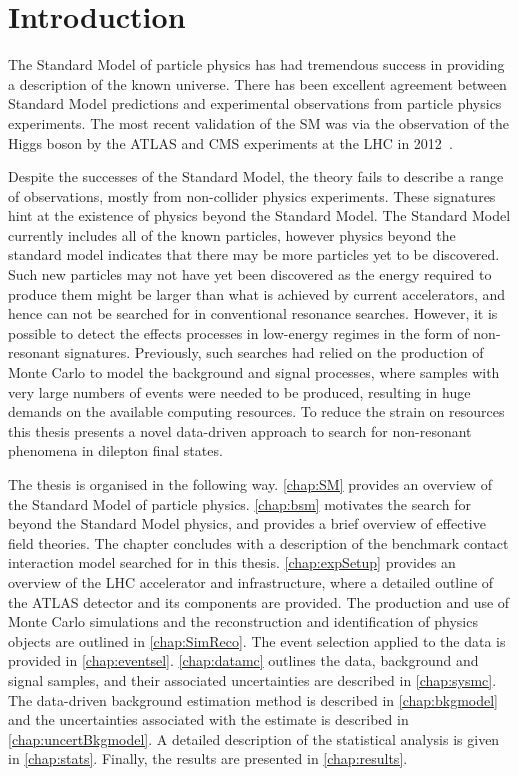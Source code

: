 \chapter{Introduction}\label{chap:intro}

The Standard Model of particle physics has had tremendous success in providing a description of the known universe. There has been excellent agreement between Standard Model predictions and experimental observations from particle physics experiments. The most recent validation of the SM was via the observation of the Higgs boson by the ATLAS and CMS experiments at the LHC in 2012~\cite{Chatrchyan2012,Aad_2012}.

Despite the successes of the Standard Model, the theory fails to describe a range of observations, mostly from non-collider physics experiments. These signatures hint at the existence of physics beyond the Standard Model. The Standard Model currently includes all of the known particles, however physics beyond the standard model indicates that there may be more particles yet to be discovered. Such new particles may not have yet been discovered as the energy required to produce them might be larger than what is achieved by current accelerators, and hence can not be searched for in conventional resonance searches. However, it is possible to detect the effects processes in low-energy regimes in the form of non-resonant signatures. Previously, such searches had relied on the production of Monte Carlo to model the background and signal processes, where samples with very large numbers of events were needed to be produced, resulting in huge demands on the available computing resources. To reduce the strain on resources this thesis presents a novel data-driven approach to search for non-resonant phenomena in dilepton final states. 

The thesis is organised in the following way. \cref{chap:SM} provides an overview of the Standard Model of particle physics. \cref{chap:bsm} motivates the search for beyond the Standard Model physics, and provides a brief overview of effective field theories. The chapter concludes with a description of the benchmark contact interaction model searched for in this thesis. \cref{chap:expSetup} provides an overview of the LHC accelerator and infrastructure, where a detailed outline of the ATLAS detector and its components are provided. The production and use of Monte Carlo simulations and the reconstruction and identification of physics objects are outlined in \cref{chap:SimReco}. The event selection applied to the data is provided in \cref{chap:eventsel}. \cref{chap:datamc} outlines the data, background and signal samples, and their associated uncertainties are described in \cref{chap:sysmc}. The data-driven background estimation method is described in \cref{chap:bkgmodel} and the uncertainties associated with the estimate is described in \cref{chap:uncertBkgmodel}. A detailed description of the statistical analysis is given in \cref{chap:stats}. Finally, the results are presented in \cref{chap:results}. 